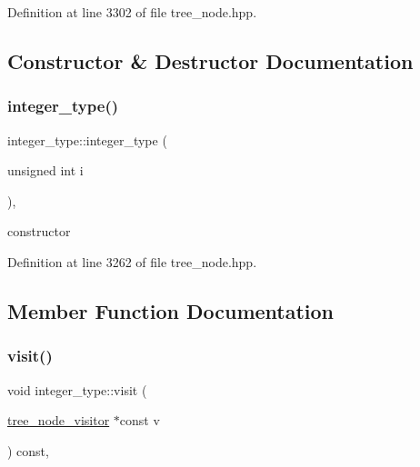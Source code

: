 Definition at line 3302 of file tree\+\_\+node.\+hpp.



\subsection{Constructor \& Destructor Documentation}
\mbox{\label{structinteger__type_a20a89fdf17de1c45ef0d94af84091d28}} 
\subsubsection{\texorpdfstring{integer\+\_\+type()}{integer\_type()}}
{\footnotesize\ttfamily integer\+\_\+type\+::integer\+\_\+type (\begin{DoxyParamCaption}\item[{unsigned int}]{i }\end{DoxyParamCaption})\hspace{0.3cm}{\ttfamily [inline]}, {\ttfamily [explicit]}}



constructor 



Definition at line 3262 of file tree\+\_\+node.\+hpp.



\subsection{Member Function Documentation}
\mbox{\label{structinteger__type_af6ef21cdf33588b79656e930c2444987}} 
\subsubsection{\texorpdfstring{visit()}{visit()}}
{\footnotesize\ttfamily void integer\+\_\+type\+::visit (\begin{DoxyParamCaption}\item[{\hyperlink{classtree__node__visitor}{tree\+\_\+node\+\_\+visitor} $\ast$const}]{v }\end{DoxyParamCaption}) const\hspace{0.3cm}{\ttfamily [override]}, {\ttfamily [virtual]}}



